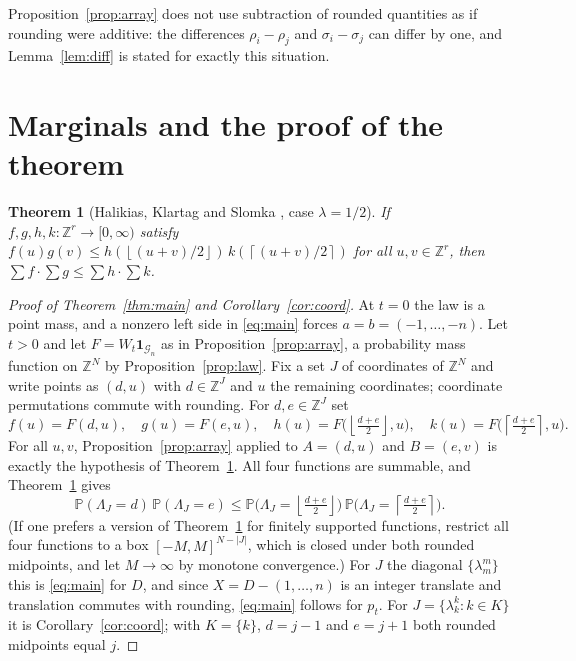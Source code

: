 \documentclass[11pt]{amsart}
\newtheorem{theorem}{Theorem}[section]
\theoremstyle{remark}
\numberwithin{equation}{section}
\newcommand{\Pp}{\mathbb P}
\newcommand{\1}{\mathbf 1}
\newcommand{\Z}{\mathbb Z}
\newcommand{\fl}[1]{\left\lfloor #1\right\rfloor}
\newcommand{\cl}[1]{\left\lceil #1\right\rceil}
\begin{document}
Proposition~\ref{prop:array} does not use subtraction of rounded quantities as if rounding were additive: the differences $\rho_i-\rho_j$ and $\sigma_i-\sigma_j$ can differ by one, and Lemma~\ref{lem:diff} is stated for exactly this situation.

\section{Marginals and the proof of the theorem}\label{sec:proof}

\begin{theorem}[{Halikias, Klartag and Slomka \cite[Theorem~1.2]{HKS}, case $\lambda=1/2$}]\label{thm:hks}
If $f,g,h,k\colon\Z^r\to[0,\infty)$ satisfy $f(u)g(v)\le h(\fl{(u+v)/2})\,k(\cl{(u+v)/2})$ for all $u,v\in\Z^r$, then $\sum f\cdot\sum g\le\sum h\cdot\sum k$.
\end{theorem}

\begin{proof}[Proof of Theorem~\ref{thm:main} and Corollary~\ref{cor:coord}]
At $t=0$ the law is a point mass, and a nonzero left side in \eqref{eq:main} forces $a=b=(-1,\dots,-n)$. Let $t>0$ and let $F=W_t\1_{\mathcal G_n}$ as in Proposition~\ref{prop:array}, a probability mass function on $\Z^N$ by Proposition~\ref{prop:law}. Fix a set $J$ of coordinates of $\Z^N$ and write points as $(d,u)$ with $d\in\Z^J$ and $u$ the remaining coordinates; coordinate permutations commute with rounding. For $d,e\in\Z^J$ set
\[
f(u)=F(d,u),\quad g(u)=F(e,u),\quad h(u)=F\bigl(\fl{\tfrac{d+e}2},u\bigr),\quad k(u)=F\bigl(\cl{\tfrac{d+e}2},u\bigr).
\]
For all $u,v$, Proposition~\ref{prop:array} applied to $A=(d,u)$ and $B=(e,v)$ is exactly the hypothesis of Theorem~\ref{thm:hks}. All four functions are summable, and Theorem~\ref{thm:hks} gives
\[
\Pp(\Lambda_J=d)\,\Pp(\Lambda_J=e)\le\Pp\bigl(\Lambda_J=\fl{\tfrac{d+e}2}\bigr)\,\Pp\bigl(\Lambda_J=\cl{\tfrac{d+e}2}\bigr).
\]
(If one prefers a version of Theorem~\ref{thm:hks} for finitely supported functions, restrict all four functions to a box $[-M,M]^{N-|J|}$, which is closed under both rounded midpoints, and let $M\to\infty$ by monotone convergence.) For $J$ the diagonal $\{\lambda^m_m\}$ this is \eqref{eq:main} for $D$, and since $X=D-(1,\dots,n)$ is an integer translate and translation commutes with rounding, \eqref{eq:main} follows for $p_t$. For $J=\{\lambda^k_k:k\in K\}$ it is Corollary~\ref{cor:coord}; with $K=\{k\}$, $d=j-1$ and $e=j+1$ both rounded midpoints equal $j$.
\end{proof}
\end{document}
